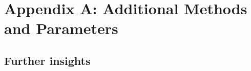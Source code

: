 \documentclass[11pt]{article}
\begin{document}
\section*{Appendix A: Additional Methods and Parameters}

%
% 
%
%
%
%

\renewcommand{\theequation}{A\arabic{equation}}
\renewcommand{\thetable}{A\arabic{table}}
\setcounter{equation}{0}  %
\setcounter{figure}{0}
\setcounter{table}{0}

%
%
%
%

\subsection*{Further insights}
\end{document}
